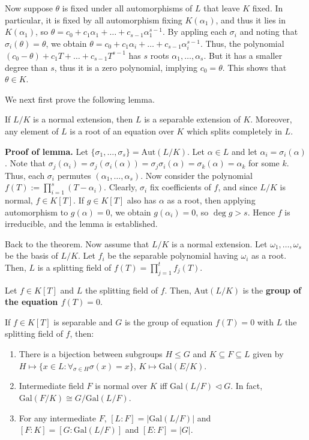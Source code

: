 \documentclass{template}
\begin{document}
Now suppose $\theta$ is fixed under all automorphisms of $L$ that leave $K$
fixed. In particular, it is fixed by all automorphism fixing $K(\alpha_1)$, and
thus it lies in $K(\alpha_1)$, so
$\theta=c_0+c_1\alpha_1+\dots+c_{s-1}\alpha_1^{s-1}$. By appling each $\sigma_i$
and noting that $\sigma_i(\theta)=\theta$, we obtain
$\theta=c_0+c_1\alpha_i+\dots+c_{s-1}\alpha_i^{s-1}$. Thus, the polynomial
$(c_0-\theta)+c_1T+\dots+c_{s-1}T^{s-1}$ has $s$ roots
$\alpha_1,\dots,\alpha_s$. But it has a smaller degree than $s$, thus it is a
zero polynomial, implying $c_0=\theta$. This shows that $\theta \in K$.

We next first prove the following lemma.
\begin{lemma}
    If $L/K$ is a normal extension, then $L$ is a separable extension of $K$.
    Moreover, any element of $L$ is a root of an equation over $K$ which splits
    completely in $L$.
\end{lemma}

\textbf{Proof of lemma.} Let $\{\sigma_1,\dots,\sigma_s\}=\text{Aut}(L/K)$. Let
$\alpha \in L$ and let $\alpha_i = \sigma_i(\alpha)$. Note that
$\sigma_j(\alpha_i) = \sigma_j(\sigma_i(\alpha)) =
\sigma_j\sigma_i(\alpha)=\sigma_k(\alpha)=\alpha_k$ for some $k$. Thus, each
$\sigma_i$ permutes $(\alpha_1,\dots,\alpha_s)$. Now consider the polynomial
$f(T) := \prod_{i=1}^s (T-\alpha_i)$. Clearly, $\sigma_i$ fix coefficients of
$f$, and since $L/K$ is normal, $f \in K[T]$. If $g \in K[T]$ also has $\alpha$
as a root, then applying automorphism to $g(\alpha)=0$, we obtain
$g(\alpha_i)=0$, so $\deg g > s$. Hence $f$ is irreducible, and the lemma is
established.

Back to the theorem. Now assume that $L/K$ is a normal extension. Let
$\omega_1,\dots,\omega_s$ be the basis of $L/K$. Let $f_i$ be the separable
polynomial having $\omega_i$ as a root. Then, $L$ is a splitting field of $f(T)
= \prod_{j=1}^t f_j(T)$.

\begin{definition}
    Let $f \in K[T]$ and $L$ the splitting field of $f$. Then, $\text{Aut}(L/K)$
    is the \textbf{group of the equation $f(T)=0$}.
\end{definition}

\begin{theorem}
    If $f \in K[T]$ is separable and $G$ is the group of equation $f(T)=0$
    with $L$ the splitting field of $f$, then:
    \begin{enumerate}
        \item[(a)] There is a bijection between subgroups $H \leq G$ and $K
        \subseteq F \subseteq L$ given by $H \mapsto \{x \in L: \forall_{\sigma
        \in H} \sigma(x)=x\}$, $K \mapsto \text{Gal}(E/K)$.
        \item[(b)] Intermediate field $F$ is normal over $K$ iff
        $\text{Gal}(L/F) \triangleleft G$. In fact, $\text{Gal}(F/K) \cong
        G/\text{Gal}(L/F)$.
        \item[(c)] For any intermediate $F$, $[L:F]=|\text{Gal}(L/F)|$ and
        $[F:K] = [G:\text{Gal}(L/F)]$ and $[E:F]=|G|$.
    \end{enumerate}
\end{theorem}
\end{document}
